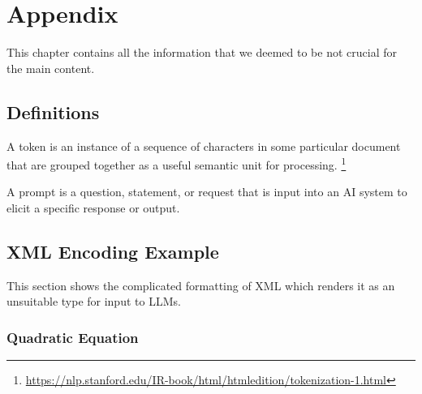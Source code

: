 \chapter{Appendix}

This chapter contains all the information that we deemed to be not crucial for the main content.


\section{Definitions}
\label{app:definitions}

\begin{definition}[Token]
\label{def:token}
A token is an instance of a sequence of characters in some particular document that are grouped together as a useful semantic unit for processing. \footnote{\url{https://nlp.stanford.edu/IR-book/html/htmledition/tokenization-1.html}}
\end{definition}

\begin{definition}[Prompt]
\label{def:prompt}
A prompt is a question, statement, or request that is input into an AI system to elicit a specific response or output.\footnotemark
\end{definition}



\section{XML Encoding Example}
This section shows the complicated formatting of XML which renders it as an unsuitable type for input to \ac{LLMs}.

\subsection{Quadratic Equation}
\label{app:xml_quadratic}

